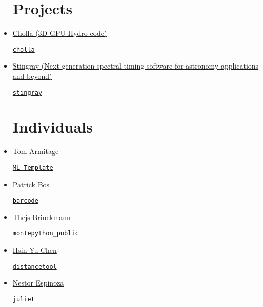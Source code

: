 \documentclass[11pt,a4paper]{article}
\begin{document}
\begin{itemize}
\section*{Projects}  
\item \href{https://github.com/cholla-hydro}{Cholla (3D GPU Hydro code)}
  \begin{itemize}
    \href{https://github.com/cholla-hydro/cholla}{{\tt cholla}}
  \end{itemize}

\item \href{https://github.com/StingraySoftware}{Stingray (Next-generation spectral-timing software for astronomy applications and beyond)}
  \begin{itemize}
    \href{https://github.com/StingraySoftware/stingray}{{\tt stingray}}
  \end{itemize}

 

  
\section*{Individuals}  
 
\item \href{https://github.com/TomArmitage}{Tom Armitage}
  \begin{itemize}
    \href{https://github.com/TomArmitage/ML\_Template}{{\tt ML\_Template}}
  \end{itemize}

\item \href{https://github.com/egpbos}{Patrick Bos}
  \begin{itemize}
    \href{https://github.com/egpbos/barcode}{{\tt barcode}}
  \end{itemize}

\item \href{https://github.com/brinckmann}{Thejs Brinckmann}
  \begin{itemize}
    \href{https://github.com/brinckmann/montepython\_public}{{\tt montepython\_public}}
  \end{itemize}
  
\item \href{https://github.com/hsinyuc}{Hsin-Yu Chen} 
  \begin{itemize}
    \href{https://github.com/hsinyuc/distancetool}{\tt distancetool}
  \end{itemize}


\item \href{https://github.com/nespinoza}{Nestor Espinoza}
  \begin{itemize}
    \href{https://github.com/nespinoza/juliet}{\tt juliet}
  \end{itemize}


\end{itemize}
\end{document}
